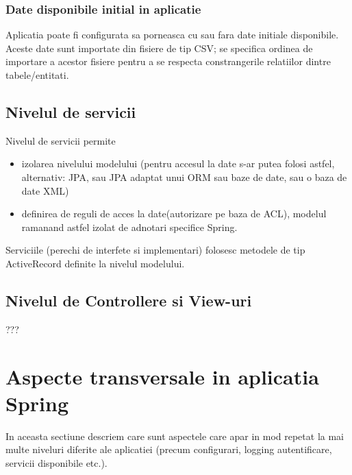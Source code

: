 \subsubsection{Date disponibile initial in aplicatie}
Aplicatia poate fi configurata sa porneasca cu sau fara date initiale
disponibile.
Aceste date sunt importate din fisiere de tip CSV; se specifica ordinea de
importare a acestor fisiere pentru a se respecta constrangerile relatiilor
dintre tabele/entitati.

\subsection{Nivelul de servicii}
Nivelul de servicii permite 
\begin{itemize}
  \item izolarea nivelului modelului (pentru accesul la
date s-ar putea folosi astfel, alternativ: JPA, sau JPA adaptat unui ORM sau
baze de date, sau o baza de date XML)
  \item definirea de reguli de acces la date(autorizare pe baza de ACL), modelul
  ramanand astfel izolat de adnotari specifice Spring.
\end{itemize} 
Serviciile (perechi de interfete si implementari) folosesc metodele de tip ActiveRecord definite la
nivelul modelului.

\subsection{Nivelul de Controllere si View-uri}
???

\section{Aspecte transversale in aplicatia Spring}
In aceasta sectiune descriem care sunt aspectele care apar in mod repetat la mai
multe niveluri diferite ale aplicatiei (precum configurari, logging
autentificare, servicii disponibile etc.).

